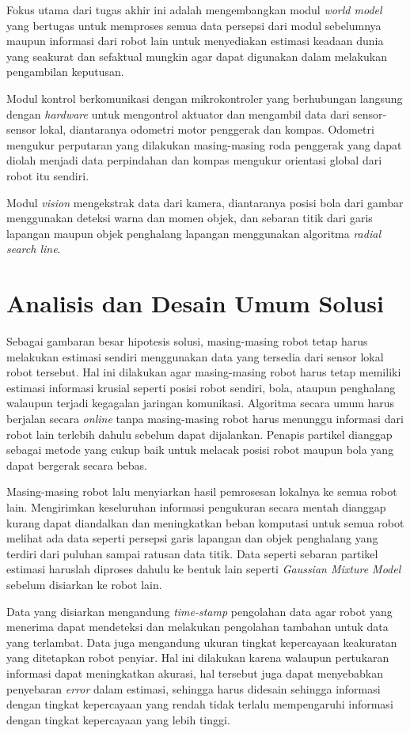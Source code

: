 Fokus utama dari tugas akhir ini adalah mengembangkan modul \textit{world model} yang bertugas untuk memproses semua data persepsi dari modul sebelumnya maupun informasi dari robot lain untuk menyediakan estimasi keadaan dunia yang seakurat dan sefaktual mungkin agar dapat digunakan dalam melakukan pengambilan keputusan.

Modul kontrol berkomunikasi dengan mikrokontroler yang berhubungan langsung dengan \textit{hardware} untuk mengontrol aktuator dan mengambil data dari sensor-sensor lokal, diantaranya odometri motor penggerak dan kompas. Odometri mengukur perputaran yang dilakukan masing-masing roda penggerak yang dapat diolah menjadi data perpindahan dan kompas mengukur orientasi global dari robot itu sendiri.

Modul \textit{vision} mengekstrak data dari kamera, diantaranya posisi bola dari gambar menggunakan deteksi warna dan momen objek, dan sebaran titik dari garis lapangan maupun objek penghalang lapangan menggunakan algoritma \textit{radial search line}.

\section{Analisis dan Desain Umum Solusi}

Sebagai gambaran besar hipotesis solusi, masing-masing robot tetap harus melakukan estimasi sendiri menggunakan data yang tersedia dari sensor lokal robot tersebut. Hal ini dilakukan agar masing-masing robot harus tetap memiliki estimasi informasi krusial seperti posisi robot sendiri, bola, ataupun penghalang walaupun terjadi kegagalan jaringan komunikasi. Algoritma secara umum harus berjalan secara \textit{online} tanpa masing-masing robot harus menunggu informasi dari robot lain terlebih dahulu sebelum dapat dijalankan. Penapis partikel dianggap sebagai metode yang cukup baik untuk melacak posisi robot maupun bola yang dapat bergerak secara bebas.

Masing-masing robot lalu menyiarkan hasil pemrosesan lokalnya ke semua robot lain. Mengirimkan keseluruhan informasi pengukuran secara mentah dianggap kurang dapat diandalkan dan meningkatkan beban komputasi untuk semua robot melihat ada data seperti persepsi garis lapangan dan objek penghalang yang terdiri dari puluhan sampai ratusan data titik. Data seperti sebaran partikel estimasi haruslah diproses dahulu ke bentuk lain seperti \textit{Gaussian Mixture Model} sebelum disiarkan ke robot lain.

Data yang disiarkan mengandung \textit{time-stamp} pengolahan data agar robot yang menerima dapat mendeteksi dan melakukan pengolahan tambahan untuk data yang terlambat. Data juga mengandung ukuran tingkat kepercayaan keakuratan yang ditetapkan robot penyiar. Hal ini dilakukan karena walaupun pertukaran informasi dapat meningkatkan akurasi, hal tersebut juga dapat menyebabkan penyebaran \textit{error} dalam estimasi, sehingga harus didesain sehingga informasi dengan tingkat kepercayaan yang rendah tidak terlalu mempengaruhi informasi dengan tingkat kepercayaan yang lebih tinggi.

